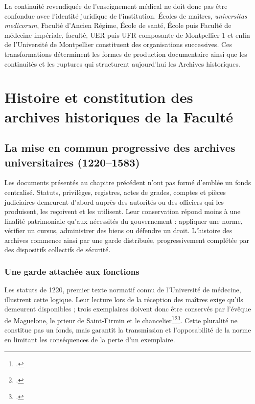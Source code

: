 La continuité revendiquée de l'enseignement médical ne doit donc pas être confondue avec l'identité juridique de l'institution. Écoles de maîtres, \emph{universitas medicorum}, Faculté d'Ancien Régime, École de santé, École puis Faculté de médecine impériale, faculté, UER puis UFR composante de Montpellier 1 et enfin de l'Université de Montpellier constituent des organisations successives. Ces transformations déterminent les formes de production documentaire ainsi que les continuités et les ruptures qui structurent aujourd'hui les Archives historiques.

\chapter{Histoire et constitution des archives historiques de la Faculté}

\section{La mise en commun progressive des archives universitaires (1220--1583)}
\label{sec:mise-en-commun-archives}

Les documents présentés au chapitre précédent n'ont pas formé d'emblée un fonds centralisé. Statuts, privilèges, registres, actes de grades, comptes et pièces judiciaires demeurent d'abord auprès des autorités ou des officiers qui les produisent, les reçoivent et les utilisent. Leur conservation répond moins à une finalité patrimoniale qu'aux nécessités du gouvernement : appliquer une norme, vérifier un cursus, administrer des biens ou défendre un droit. L'histoire des archives commence ainsi par une garde distribuée, progressivement complétée par des dispositifs collectifs de sécurité.

\subsection{Une garde attachée aux fonctions}

Les statuts de 1220, premier texte normatif connu de l'Université de médecine, illustrent cette logique. Leur lecture lors de la réception des maîtres exige qu'ils demeurent disponibles ; trois exemplaires doivent donc être conservés par l'évêque de Maguelone, le prieur de Saint-Firmin et le chancelier\footcite[fol.~187--188, vues~186--187/348]{ADHG1126}\footcite{Conrad1220}\footcite[p.~IX, vue~28 de la version numérisée]{CalmetteCartulaire1912}. Cette pluralité ne constitue pas un fonds, mais garantit la transmission et l'opposabilité de la norme en limitant les conséquences de la perte d'un exemplaire.

